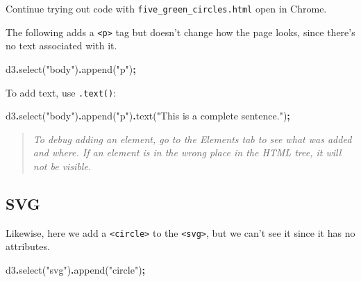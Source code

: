 \documentclass[
  openany]{book}
\newenvironment{Shaded}{\begin{snugshade}}{\end{snugshade}}
\newcommand{\FunctionTok}[1]{\textcolor[rgb]{0.00,0.00,0.00}{#1}}
\newcommand{\NormalTok}[1]{#1}
\newcommand{\OperatorTok}[1]{\textcolor[rgb]{0.81,0.36,0.00}{\textbf{#1}}}
\newcommand{\StringTok}[1]{\textcolor[rgb]{0.31,0.60,0.02}{#1}}
\begin{document}
Continue trying out code with \texttt{five\_green\_circles.html} open in Chrome.

The following adds a \texttt{\textless{}p\textgreater{}} tag but doesn't change how the page looks, since there's no text associated with it.

\begin{Shaded}
\begin{Highlighting}[]
\NormalTok{d3}\OperatorTok{.}\FunctionTok{select}\NormalTok{(}\StringTok{"body"}\NormalTok{)}\OperatorTok{.}\FunctionTok{append}\NormalTok{(}\StringTok{"p"}\NormalTok{)}\OperatorTok{;}
\end{Highlighting}
\end{Shaded}

To add text, use \texttt{.text()}:

\begin{Shaded}
\begin{Highlighting}[]
\NormalTok{d3}\OperatorTok{.}\FunctionTok{select}\NormalTok{(}\StringTok{"body"}\NormalTok{)}\OperatorTok{.}\FunctionTok{append}\NormalTok{(}\StringTok{"p"}\NormalTok{)}\OperatorTok{.}\FunctionTok{text}\NormalTok{(}\StringTok{"This is a complete sentence."}\NormalTok{)}\OperatorTok{;}
\end{Highlighting}
\end{Shaded}

\begin{quote}
\emph{To debug adding an element, go to the Elements tab to see what was added and where. If an element is in the wrong place in the HTML tree, it will not be visible.}
\end{quote}

\hypertarget{svg-1}{%
\subsection{SVG}\label{svg-1}}

Likewise, here we add a \texttt{\textless{}circle\textgreater{}} to the \texttt{\textless{}svg\textgreater{}}, but we can't see it since it has no attributes.

\begin{Shaded}
\begin{Highlighting}[]
\NormalTok{d3}\OperatorTok{.}\FunctionTok{select}\NormalTok{(}\StringTok{"svg"}\NormalTok{)}\OperatorTok{.}\FunctionTok{append}\NormalTok{(}\StringTok{"circle"}\NormalTok{)}\OperatorTok{;}
\end{Highlighting}
\end{Shaded}
\end{document}
